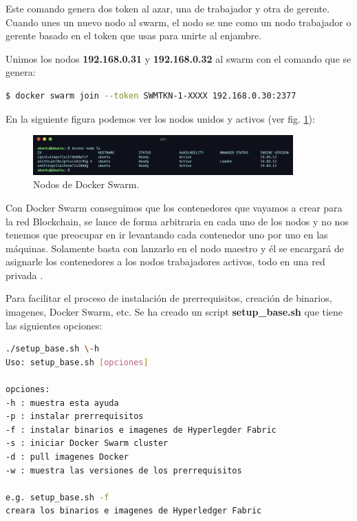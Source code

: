 \noindent Este comando genera dos token al azar, una de trabajador y otra de gerente. Cuando unes un nuevo nodo al 
swarm, el nodo se une como un nodo trabajador o gerente basado en el token que usas para unirte al enjambre.

\vspace{5mm}

\noindent Unimos los nodos \textbf{192.168.0.31} y \textbf{192.168.0.32} al swarm con el comando que se genera: 

\begin{lstlisting}[language=bash]
  $ docker swarm join --token SWMTKN-1-XXXX 192.168.0.30:2377
\end{lstlisting}

\newpage

\noindent En la siguiente figura podemos ver los nodos unidos y activos (ver fig. \ref{fig:node-ls-worker}):

\begin{figure}[ht!]
  \centering
  \includegraphics[width=10cm]{imagenes/desarrollo/comandos/node_ls_worker}
  \caption{Nodos de Docker Swarm.}
  \label{fig:node-ls-worker}
\end{figure}

\noindent Con Docker Swarm conseguimos que los contenedores que vayamos a crear para la red Blockchain, se lance de forma 
arbitraria en cada uno de los nodos y no nos tenemos que preocupar en ir levantando cada contenedor uno por uno
en las máquinas. Solamente basta con lanzarlo en el nodo maestro y él se encargará de asignarle los contenedores
a los nodos trabajadores activos, todo en una red privada \cite{hyperledger-fabric-rasp-swarm}.

\vspace{5mm}

Para facilitar el proceso de instalación de prerrequisitos, creación de binarios, imagenes, Docker Swarm, etc. Se ha
creado un script \textbf{setup\_base.sh} que tiene las siguientes opciones:

\begin{lstlisting}[language=bash]
./setup_base.sh \-h
Uso: setup_base.sh [opciones]

opciones:
-h : muestra esta ayuda
-p : instalar prerrequisitos
-f : instalar binarios e imagenes de Hyperlegder Fabric
-s : iniciar Docker Swarm cluster
-d : pull imagenes Docker
-w : muestra las versiones de los prerrequisitos

e.g. setup_base.sh -f
creara los binarios e imagenes de Hyperledger Fabric
\end{lstlisting}

